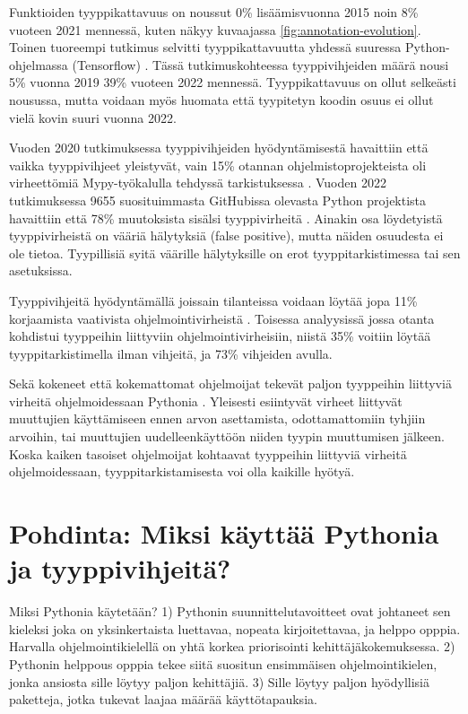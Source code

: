 \begin{otherlanguage}{finnish}
Funktioiden tyyppikattavuus on noussut 0\% lisäämisvuonna 2015 noin 8\% vuoteen 2021 mennessä, kuten näkyy kuvaajassa \ref{fig:annotation-evolution}. Toinen tuoreempi tutkimus selvitti tyyppikattavuutta yhdessä suuressa Python-ohjelmassa (Tensorflow) \cite{lin_towards_large_scale_2023}. Tässä tutkimuskohteessa tyyppivihjeiden määrä nousi 5\% vuonna 2019 39\% vuoteen 2022 mennessä. Tyyppikattavuus on ollut selkeästi nousussa, mutta voidaan myös huomata että tyypitetyn koodin osuus ei ollut vielä kovin suuri vuonna 2022.

Vuoden 2020 tutkimuksessa tyyppivihjeiden hyödyntämisestä havaittiin että vaikka tyyppivihjeet yleistyvät, vain 15\% otannan ohjelmistoprojekteista oli virheettömiä Mypy-työkalulla tehdyssä tarkistuksessa \cite{rak-amnouykit_taleoftwo_2020}. Vuoden 2022 tutkimuksessa 9655 suosituimmasta GitHubissa olevasta Python projektista havaittiin että 78\% muutoksista sisälsi tyyppivirheitä \cite{di_grazia_evolution_2022}. Ainakin osa löydetyistä tyyppivirheistä on vääriä hälytyksiä (false positive), mutta näiden osuudesta ei ole tietoa. Tyypillisiä syitä väärille hälytyksille on erot tyyppitarkistimessa tai sen asetuksissa.

Tyyppivihjeitä hyödyntämällä joissain tilanteissa voidaan löytää jopa 11\% korjaamista vaativista ohjelmointivirheistä \cite{khan_empirical_2022}. Toisessa analyysissä jossa otanta kohdistui tyyppeihin liittyviin ohjelmointivirheisiin, niistä 35\% voitiin löytää tyyppitarkistimella ilman vihjeitä, ja 73\% vihjeiden avulla.

Sekä kokeneet että kokemattomat ohjelmoijat tekevät paljon tyyppeihin liittyviä virheitä ohjelmoidessaan Pythonia \cite{khan_empirical_2022}. Yleisesti esiintyvät virheet liittyvät muuttujien käyttämiseen ennen arvon asettamista, odottamattomiin tyhjiin arvoihin, tai muuttujien uudelleenkäyttöön niiden tyypin muuttumisen jälkeen. Koska kaiken tasoiset ohjelmoijat kohtaavat tyyppeihin liittyviä virheitä ohjelmoidessaan, tyyppitarkistamisesta voi olla kaikille hyötyä.

\section*{Pohdinta: Miksi käyttää Pythonia ja tyyppivihjeitä?}
Miksi Pythonia käytetään? 1) Pythonin suunnittelutavoitteet ovat johtaneet sen kieleksi joka on yksinkertaista luettavaa, nopeata kirjoitettavaa, ja helppo opppia. Harvalla ohjelmointikielellä on yhtä korkea priorisointi kehittäjäkokemuksessa. 2) Pythonin helppous opppia tekee siitä suositun ensimmäisen ohjelmointikielen, jonka ansiosta sille löytyy paljon kehittäjiä. 3) Sille löytyy paljon hyödyllisiä paketteja, jotka tukevat laajaa määrää käyttötapauksia.


\end{otherlanguage}
